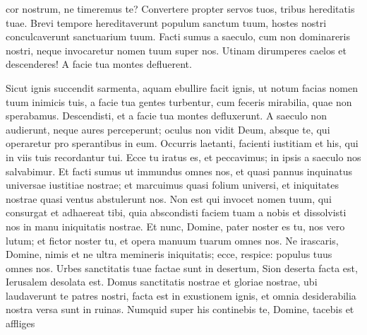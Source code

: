 \begin{biblechapter}
\begin{biblechapter}
\begin{biblechapter}
\begin{biblechapter}
\begin{biblechapter}
\begin{biblechapter}
\begin{biblechapter}
\begin{biblechapter}
\begin{biblechapter}
\begin{biblechapter}
\begin{biblechapter}
\begin{biblechapter}
\begin{biblechapter}
\begin{biblechapter}
\begin{biblechapter}
\begin{biblechapter}
\begin{biblechapter}
\begin{biblechapter}
\begin{biblechapter}
\begin{biblechapter}
\begin{biblechapter}
\begin{biblechapter}
\begin{biblechapter}
\begin{biblechapter}
\begin{biblechapter}
\begin{biblechapter}
\begin{biblechapter}
\begin{biblechapter}
\begin{biblechapter}
\begin{biblechapter}
\begin{biblechapter}
\begin{biblechapter}
\begin{biblechapter}
\begin{biblechapter}
\begin{biblechapter}
\begin{biblechapter}
\begin{biblechapter}
\begin{biblechapter}
\begin{biblechapter}
\begin{biblechapter}
\begin{biblechapter}
\begin{biblechapter}
\begin{biblechapter}
\begin{biblechapter}
\begin{biblechapter}
\begin{biblechapter}
\begin{biblechapter}
\begin{biblechapter}
\begin{biblechapter}
\begin{biblechapter}
\begin{biblechapter}
\begin{biblechapter}
\begin{biblechapter}
\begin{biblechapter}
\begin{biblechapter}
\begin{biblechapter}
\begin{biblechapter}
\begin{biblechapter}
\begin{biblechapter}
\begin{biblechapter}
\begin{biblechapter}
\begin{biblechapter}
\begin{biblechapter}
cor nostrum, ne timeremus te?
 Convertere propter servos tuos,
 tribus hereditatis tuae.
 \verse Brevi tempore hereditaverunt populum sanctum tuum,
 hostes nostri conculcaverunt sanctuarium tuum.
 \verse Facti sumus a saeculo,
 cum non dominareris nostri,
 neque invocaretur nomen tuum super nos.
 Utinam dirumperes caelos et descenderes!
 A facie tua montes defluerent.
 
\begin{biblechapter}
\verse Sicut ignis succendit sarmenta,
 aquam ebullire facit ignis,
 ut notum facias nomen tuum inimicis tuis,
 a facie tua gentes turbentur,
 \verse cum feceris mirabilia,
 quae non sperabamus.
 Descendisti, et a facie tua montes defluxerunt.
 \verse A saeculo non audierunt, neque aures perceperunt;
 oculus non vidit Deum, absque te,
 qui operaretur pro sperantibus in eum.
 \verse Occurris laetanti, facienti iustitiam
 et his, qui in viis tuis recordantur tui.
 Ecce tu iratus es, et peccavimus;
 in ipsis a saeculo nos salvabimur.
 \verse Et facti sumus ut immundus omnes nos,
 et quasi pannus inquinatus universae iustitiae nostrae;
 et marcuimus quasi folium universi,
 et iniquitates nostrae quasi ventus abstulerunt nos.
 \verse Non est qui invocet nomen tuum,
 qui consurgat et adhaereat tibi,
 quia abscondisti faciem tuam a nobis
 et dissolvisti nos in manu iniquitatis nostrae.
 \verse Et nunc, Domine, pater noster es tu,
 nos vero lutum; et fictor noster tu,
 et opera manuum tuarum omnes nos.
 \verse Ne irascaris, Domine, nimis
 et ne ultra memineris iniquitatis;
 ecce, respice: populus tuus omnes nos.
 \verse Urbes sanctitatis tuae factae sunt in desertum,
 Sion deserta facta est,
 Ierusalem desolata est.
 \verse Domus sanctitatis nostrae et gloriae nostrae,
 ubi laudaverunt te patres nostri,
 facta est in exustionem ignis,
 et omnia desiderabilia nostra versa sunt in ruinas.
 \verse Numquid super his continebis te, Domine,
 tacebis et affliges 
\end{biblechapter}
\end{biblechapter}
\end{biblechapter}
\end{biblechapter}
\end{biblechapter}
\end{biblechapter}
\end{biblechapter}
\end{biblechapter}
\end{biblechapter}
\end{biblechapter}
\end{biblechapter}
\end{biblechapter}
\end{biblechapter}
\end{biblechapter}
\end{biblechapter}
\end{biblechapter}
\end{biblechapter}
\end{biblechapter}
\end{biblechapter}
\end{biblechapter}
\end{biblechapter}
\end{biblechapter}
\end{biblechapter}
\end{biblechapter}
\end{biblechapter}
\end{biblechapter}
\end{biblechapter}
\end{biblechapter}
\end{biblechapter}
\end{biblechapter}
\end{biblechapter}
\end{biblechapter}
\end{biblechapter}
\end{biblechapter}
\end{biblechapter}
\end{biblechapter}
\end{biblechapter}
\end{biblechapter}
\end{biblechapter}
\end{biblechapter}
\end{biblechapter}
\end{biblechapter}
\end{biblechapter}
\end{biblechapter}
\end{biblechapter}
\end{biblechapter}
\end{biblechapter}
\end{biblechapter}
\end{biblechapter}
\end{biblechapter}
\end{biblechapter}
\end{biblechapter}
\end{biblechapter}
\end{biblechapter}
\end{biblechapter}
\end{biblechapter}
\end{biblechapter}
\end{biblechapter}
\end{biblechapter}
\end{biblechapter}
\end{biblechapter}
\end{biblechapter}
\end{biblechapter}
\end{biblechapter}
